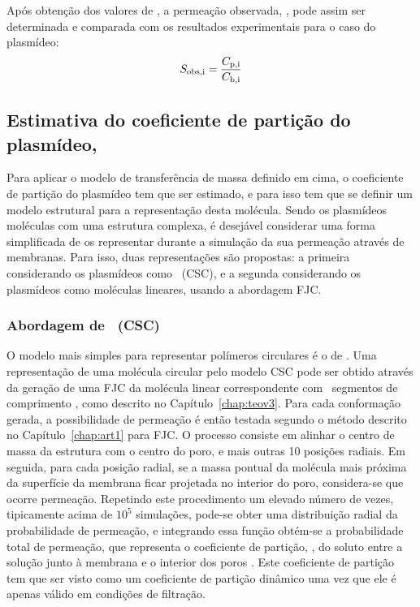 Após obtenção dos valores de \concpi, a permeação observada, \permobsi, pode assim ser determinada e comparada com os resultados experimentais para o caso do plasmídeo:
\begin{equation}
\label{eq:permobsmeu2}
S_{\mathrm{obs,i}}=\frac{C_{\mathrm{p,i}}}{C_{\mathrm{b,i}}}
\end{equation}

\subsection{Estimativa do coeficiente de partição do plasmídeo, \particao}
Para aplicar o modelo de transferência de massa definido em cima, o coeficiente de partição do plasmídeo tem que ser estimado, e para isso tem que se definir um modelo estrutural para a representação desta molécula.
Sendo os plasmídeos moléculas com uma estrutura complexa, é desejável considerar uma forma simplificada de os representar durante a simulação da sua permeação através de membranas. Para isso, duas representações são propostas: a primeira considerando os plasmídeos como \closedsc\ (CSC), e a segunda considerando os plasmídeos como moléculas lineares, usando a abordagem FJC.

\subsubsection{Abordagem de \closedsc\ (CSC)}
%
O modelo mais simples para representar polímeros circulares é o de \closedsc. Uma representação de uma molécula circular pelo modelo CSC pode ser obtido através da geração de uma FJC da molécula linear correspondente com \numsegmento\ segmentos de comprimento \comsegmento, como descrito no Capítulo~\ref{chap:teov3}.
Para cada conformação gerada, a possibilidade de permeação é então testada segundo o método descrito no Capítulo~\ref{chap:art1} para FJC. O processo consiste em alinhar o centro de massa da estrutura com o centro do poro, e mais outras 10 posições radiais. Em seguida, para cada posição radial, se a massa pontual da molécula mais próxima da superfície da membrana ficar projetada no interior do poro, considera-se que ocorre permeação. Repetindo este procedimento um elevado número de vezes, tipicamente acima de $10^{5}$ simulações, pode-se obter uma distribuição radial da probabilidade de permeação, e integrando essa função obtém-se a probabilidade total de permeação, que representa o coeficiente de partição, \particao, do soluto entre a solução junto à membrana e o interior dos poros \cite{davidson87}. Este coeficiente de partição tem que ser visto como um coeficiente de partição dinâmico uma vez que ele é apenas válido em condições de filtração. 

